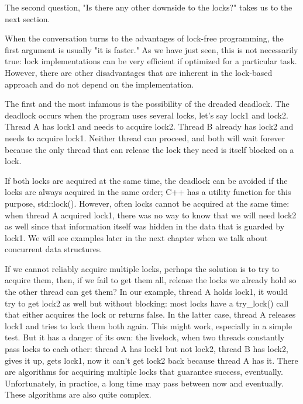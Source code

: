 The second question, "Is there any other downside to the locks?" takes us to the next section.


When the conversation turns to the advantages of lock-free programming, the first argument is usually "it is faster." As we have just seen, this is not necessarily true: lock implementations can be very efficient if optimized for a particular task. However, there are other disadvantages that are inherent in the lock-based approach and do not depend on the implementation.

The first and the most infamous is the possibility of the dreaded deadlock. The deadlock occurs when the program uses several locks, let's say lock1 and lock2. Thread A has lock1 and needs to acquire lock2. Thread B already has lock2 and needs to acquire lock1. Neither thread can proceed, and both will wait forever because the only thread that can release the lock they need is itself blocked on a lock.

If both locks are acquired at the same time, the deadlock can be avoided if the locks are always acquired in the same order; C++ has a utility function for this purpose, std::lock(). However, often locks cannot be acquired at the same time: when thread A acquired lock1, there was no way to know that we will need lock2 as well since that information itself was hidden in the data that is guarded by lock1. We will see examples later in the next chapter when we talk about concurrent data structures.

If we cannot reliably acquire multiple locks, perhaps the solution is to try to acquire them, then, if we fail to get them all, release the locks we already hold so the other thread can get them? In our example, thread A holds lock1, it would try to get lock2 as well but without blocking: most locks have a try\_lock() call that either acquires the lock or returns false. In the latter case, thread A releases lock1 and tries to lock them both again. This might work, especially in a simple test. But it has a danger of its own: the livelock, when two threads constantly pass locks to each other: thread A has lock1 but not lock2, thread B has lock2, gives it up, gets lock1, now it can't get lock2 back because thread A has it. There are algorithms for acquiring multiple locks that guarantee success, eventually. Unfortunately, in practice, a long time may pass between now and eventually. These algorithms are also quite complex.

